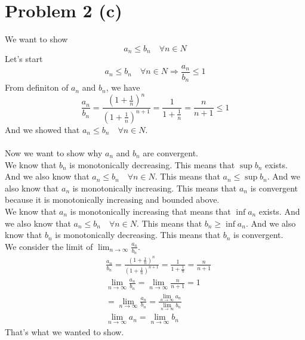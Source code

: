 \documentclass{article}
\begin{document}
\section*{Problem 2 (c)}
We want to show
\[
   a_n \leq b_n \quad \forall n \in N
\]
Let's start
\[
   a_n \leq b_n \quad \forall n \in N \Rightarrow \frac{a_n}{b_n} \leq 1
\]
From definiton of \(a_n\) and \(b_n\), we have
\[
   \frac{a_n}{b_n} = \frac{(1 + \frac{1}{n})^n}{(1 + \frac{1}{n})^{n+1}} = \frac{1}{1 + \frac{1}{n}} = \frac{n}{n+1} \leq 1
\]
And we showed that \(a_n \leq b_n \quad \forall n \in N\).\\
\\
Now we want to show why \(a_n\) and \(b_n\) are convergent.\\
We know that \(b_n\) is monotonically decreasing. This means that \(\sup b_n\) exists.
And we also know that \(a_n \leq b_n \quad \forall n \in N\). This means that \(a_n \leq \sup b_n\).
And we also know that \(a_n\) is monotonically increasing. This means that \(a_n\) is convergent 
because it is monotonically increasing and bounded above.\\
We know that \(a_n\) is monotonically increasing that means that \(\inf a_n\) exists. And we also know that
\(a_n \leq b_n \quad \forall n \in N\). This means that \(b_n \geq \inf a_n\).
And we also know that \(b_n\) is monotonically decreasing. This means that \(b_n\) is convergent.\\
We consider the limit of \(\lim_{n \rightarrow \infty}\frac{a_n}{b_n}\).
\begin{align*}
   & \frac{a_n}{b_n} = \frac{(1 + \frac{1}{n})^n}{(1 + \frac{1}{n})^{n+1}} = \frac{1}{1 + \frac{1}{n}} = \frac{n}{n+1} \\
   & \lim_{n \rightarrow \infty} \frac{a_n}{b_n} = \lim_{n \rightarrow \infty} \frac{n}{n+1} = 1 \\
   &=\lim_{n \rightarrow \infty} \frac{a_n}{b_n} = \frac{\lim_{n \rightarrow \infty} a_n}{\lim_{n \rightarrow \infty} b_n} \\
   &\lim_{n \rightarrow \infty} a_n = \lim_{n \rightarrow \infty} b_n
\end{align*}
That's what we wanted to show.
\end{document}
